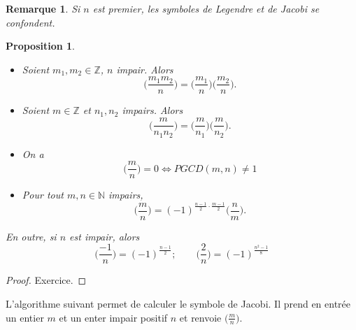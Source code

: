 \documentclass[12pt]{report}
\newtheorem*{rem}{Remarque}
\newtheorem{Prop}[thm]{Proposition}
\begin{document}
\begin{rem}
Si $n$ est premier, les symboles de Legendre et de Jacobi se confondent.
\end{rem}

\begin{Prop}\
\begin{itemize}
\item[$1)$] Soient $m_1,m_2 \in \mathbb{Z}$, $n$ impair. Alors $$\Big(  \frac{m_1 m_2}{n}\Big)= \Big(  \frac{m_1}{n}\Big) \Big(  \frac{m_2}{n}\Big). $$
\item[$2)$] Soient $m \in \mathbb{Z}$ et $n_1,n_2$ impairs. Alors 
$$    \Big(  \frac{m}{n_1 n_2}\Big)= \Big(  \frac{m}{n_1}\Big)\Big(  \frac{m}{n_2}\Big) .  $$
\item[$3)$] On a
$$     \Big(  \frac{m}{n}\Big)=0 \Longleftrightarrow PGCD(m,n) \neq 1    $$
\item[$4)$] Pour tout $m,n \in \mathbb{N}$ impairs, 
$$   \Big(  \frac{m}{n}\Big)= (-1)^{\tfrac{n-1}{2}\cdot \tfrac{m-1}{2} } \Big(  \frac{n}{m}\Big) .   $$
\end{itemize}
En outre, si $n$ est impair, alors 
$$   \Big(  \frac{-1}{n}\Big)= (-1)^{\tfrac{n-1}{2}} ; \qquad  \Big(  \frac{2}{n}\Big)= (-1)^{\tfrac{n^2-1}{8}}  $$    
\end{Prop}

\begin{proof}
Exercice.
\end{proof}


L'algorithme suivant permet de calculer le symbole de Jacobi. Il prend en entrée un entier $m$ et un enter impair positif $n$ et renvoie $ \big( \tfrac{m}{n} \big)$.\\
\end{document}
